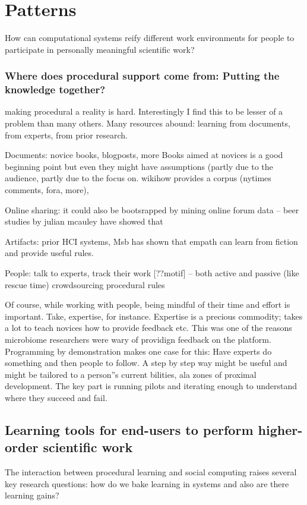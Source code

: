 \section{Patterns} 

How can computational systems reify different work environments for people to participate in personally meaningful scientific work?


\subsubsection{Where does procedural support come from: Putting the knowledge together?}
making procedural a reality is hard. Interestingly I find this to be lesser of a problem than many others. Many resources abound: learning from documents, from experts, from prior research. 

Documents: novice books, blogposts, more
Books aimed at novices is a good beginning point but even they might have assumptions (partly due to the audience, partly due to the focus on. wikihow provides a corpus
 (nytimes comments, fora, more),  

Online sharing: it could also be bootsrapped by mining online forum data -- beer studies by julian mcauley have showed that 

Artifacts: prior HCI systems, Msb has shown that empath can learn from fiction and provide useful rules. 

People: talk to experts, track their work [??motif] -- both active and passive (like rescue time)
crowdsourcing procedural rules

Of course, while working with people, being mindful of their time and effort is important. Take, expertise, for instance. Expertise is a precious commodity; takes a lot to teach novices how to provide feedback etc. This was one of the reasons microbiome researchers were wary of providign feedback on the platform. Programming by demonstration makes one case for this: Have experts do something and then people to follow. A step by step way might be useful and might be tailored to a person''s current bilities, ala zones of proximal development.
The key part is running pilots and iterating enough to understand where they succeed and fail. 

\subsection{Learning tools for end-users to perform higher-order scientific work}
The interaction between procedural learning and social computing raises several key research questions: how do we bake learning in systems and also are there learning gains?

